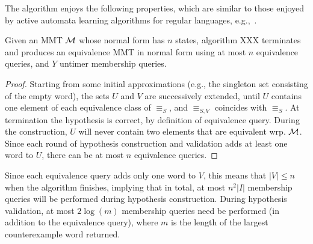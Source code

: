 
The algorithm enjoys the following properties, which are similar to those
enjoyed by active automata learning algorithms for regular languages,
e.g.,~\cite{Ang87}.

\begin{theorem}
  \label{thm:alg:termination}
Given an MMT ${\mathcal M}$ whose normal form has $n$ states, 
algorithm XXX terminates and produces an equivalence MMT in normal form
using at most $n$ equivalence queries, and
$Y$ untimer membership queries.
\end{theorem}
   
\begin{proof}
Starting from some initial approximations (e.g., the singleton
set consisting of the empty word), the sets $U$ and $V$ are
successively extended, until $U$ contains one element of each equivalence
class of $\equiv_{S}$, and $\equiv_{S,V}$ coincides with
$\equiv_{S}$. 
At termination the hypothesis is correct, by definition of equivalence query.
During the construction, $U$ will never contain two elements that are
equivalent wrp. ${\mathcal M}$.
Since each round of hypothesis construction and validation adds at least one
word to $U$, there can be at most $n$ equivalence queries.
\end{proof}

Since each equivalence query adds only one
word to $V$, this means that $|V| \leq n$ when the algorithm finishes,
implying that in total, at most $n^2|I|$ membership queries
will be performed during hypothesis construction.
During hypothesis
validation, at most $2\log(m)$ membership queries need be performed
(in addition to the equivalence query), where
$m$ is the length of the largest counterexample word returned.

